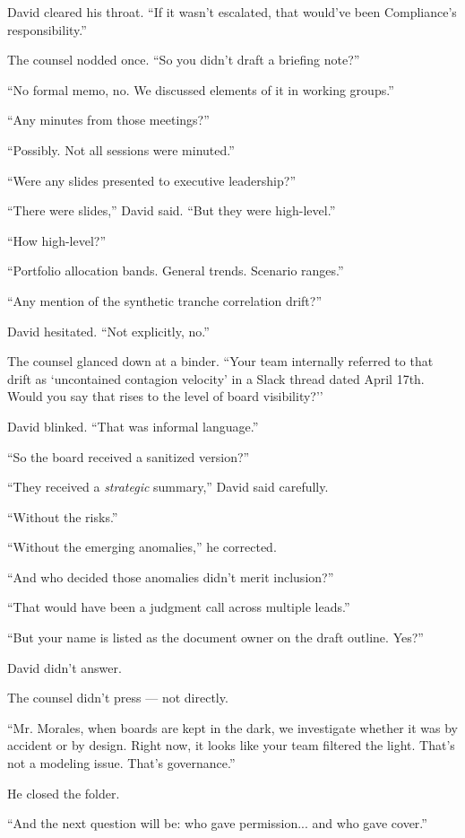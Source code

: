 David cleared his throat. ``If it wasn’t escalated, that would’ve been Compliance’s responsibility.''

The counsel nodded once. ``So you didn’t draft a briefing note?''

``No formal memo, no. We discussed elements of it in working groups.''

``Any minutes from those meetings?''

``Possibly. Not all sessions were minuted.''

``Were any slides presented to executive leadership?''

``There were slides,'' David said. ``But they were high-level.''

``How high-level?''

``Portfolio allocation bands. General trends. Scenario ranges.''

``Any mention of the synthetic tranche correlation drift?''

David hesitated. ``Not explicitly, no.''

The counsel glanced down at a binder. ``Your team internally referred to that drift as `uncontained contagion 
velocity’ in a Slack thread dated April 17th. Would you say that rises to the level of board visibility?''

David blinked. ``That was informal language.''

``So the board received a sanitized version?''

``They received a \textit{strategic} summary,'' David said carefully.

``Without the risks.''

``Without the emerging anomalies,'' he corrected.

``And who decided those anomalies didn’t merit inclusion?''

``That would have been a judgment call across multiple leads.''

``But your name is listed as the document owner on the draft outline. Yes?''

David didn’t answer.

The counsel didn’t press — not directly.

``Mr. Morales, when boards are kept in the dark, we investigate whether it was by accident or by design. Right now, 
it looks like your team filtered the light. That’s not a modeling issue. That’s governance.''

He closed the folder.

``And the next question will be: who gave permission... and who gave cover.''

